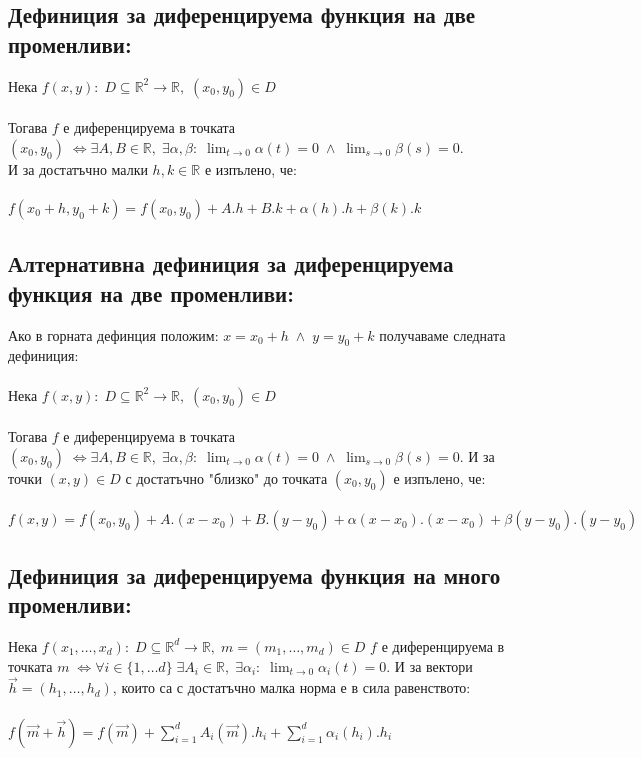 \documentclass[14pt]{extarticle}
\newcommand{\R}{\mathbb{R}}
\newcommand{\Sum}{\displaystyle\sum}
\newcommand{\Lim}[2]{\displaystyle\lim_{#1 \to #2}}
\newcommand{\Vector}[1]{\overrightarrow{#1}}
\begin{document}
\subsection*{Дефиниция за диференцируема функция на две променливи:}
Нека \(f(x, y) : \; D \subseteq \R^2 \to \R, \; (x_0, y_0) \in D \) \\\\
Тогава \(f\) е диференцируема в точката \((x_0, y_0) \; \iff \exists A, B \in \R, \;
\exists \alpha, \beta : \; \Lim{t}{0} \alpha(t) = 0 \; \land \; \Lim{s}{0} \beta(s) = 0 \). \\
И за достатъчно малки \(h, k \in \R\) е изпълено, че: \\\\
\(f(x_0 + h,y_0 + k) = f(x_0, y_0) + A.h + B.k + \alpha(h).h + \beta(k).k\)
\subsection*{Алтернативна дефиниция за диференцируема функция на две променливи:}
Ако в горната дефинция положим: \(x = x_0 + h \; \land \; y = y_0 + k\) получаваме следната дефиниция: \\\\
Нека \(f(x, y) : \; D \subseteq \R^2 \to \R, \; (x_0, y_0) \in D \) \\\\
Тогава \(f\) е диференцируема в точката \((x_0, y_0) \; \iff \exists A, B \in \R, \;
\exists \alpha, \beta : \; \Lim{t}{0} \alpha(t) = 0 \; \land \; \Lim{s}{0} \beta(s) = 0 \). И за точки \((x, y) \in D\) с достатъчно "близко" до точката \((x_0, y_0)\) е изпълено, че: \\\\
\(f(x,y) = f(x_0, y_0) + A.(x - x_0) + B.(y - y_0) + \alpha(x - x_0).(x - x_0) + \beta(y - y_0).(y - y_0)\)
\subsection*{Дефиниция за диференцируема функция на много променливи:}
Нека \(f(x_1, \dots, x_d) : \; D \subseteq \R^d \to \R, \; m = (m_1, \dots, m_d) \in D \) \(f\) е диференцируема в точката \(m \; \iff
\forall i \in \{1, \dots d\} \; \exists A_i \in \R, \; \exists \alpha_i : \; \Lim{t}{0} \alpha_i(t) = 0 \). И за вектори \(\Vector{h} = (h_1, \dots, h_d)\), които са с достатъчно малка норма е в сила равенството: \\\\
\(f(\Vector{m} + \Vector{h}) = f(\Vector{m}) + \Sum_{i = 1}^d A_i(\Vector{m}).h_i + \Sum_{i = 1}^d \alpha_{i}(h_i).h_i \)
\end{document}
